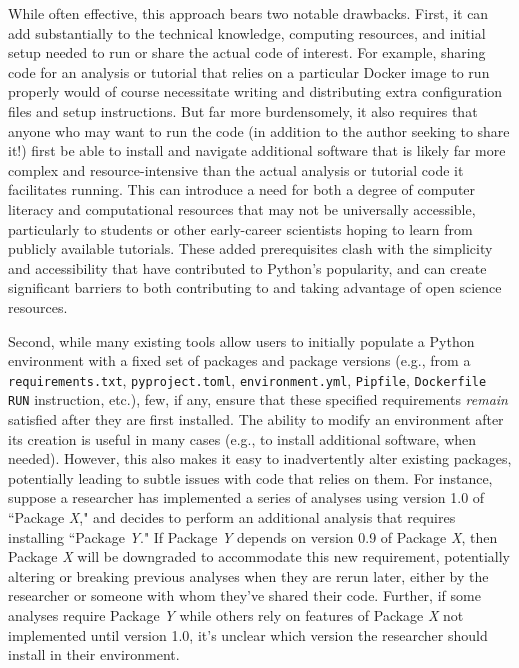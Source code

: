\documentclass[preprint,12pt, a4paper]{elsarticle}
\begin{document}
While often effective, this approach bears two notable drawbacks.
First, it can add substantially to the technical knowledge, computing
resources, and initial setup needed to run or share the actual code of
interest.  For example, sharing code for an analysis or tutorial that
relies on a particular Docker image to run properly would of course
necessitate writing and distributing extra configuration files and
setup instructions.  But far more burdensomely, it also requires that
anyone who may want to run the code (in addition to the author seeking
to share it!) first be able to install and navigate additional
software that is likely far more complex and resource-intensive than
the actual analysis or tutorial code it facilitates running.  This can
introduce a need for both a degree of computer literacy and
computational resources that may not be universally accessible,
particularly to students or other early-career scientists hoping to
learn from publicly available tutorials.  These added prerequisites
clash with the simplicity and accessibility that have contributed to
Python's popularity, and can create significant barriers to both
contributing to and taking advantage of open science resources.

Second, while many existing tools allow users to initially populate a
Python environment with a fixed set of packages and package versions
(e.g., from a \texttt{requirements.txt}, \texttt{pyproject.toml},
\texttt{environment.yml}, \texttt{Pipfile}, \texttt{Dockerfile RUN}
instruction, etc.), few, if any, ensure that these specified
requirements \textit{remain} satisfied after they are first installed.
The ability to modify an environment after its creation is useful in
many cases (e.g., to install additional software, when
needed). However, this also makes it easy to inadvertently alter
existing packages, potentially leading to subtle issues with code that
relies on them.  For instance, suppose a researcher has implemented a
series of analyses using version 1.0 of ``Package \textit{X}," and
decides to perform an additional analysis that requires installing
``Package \textit{Y}."  If Package \textit{Y} depends on version 0.9
of Package \textit{X}, then Package \textit{X} will be downgraded to
accommodate this new requirement, potentially altering or breaking
previous analyses when they are rerun later, either by the researcher
or someone with whom they've shared their code.  Further, if some
analyses require Package \textit{Y} while others rely on features of
Package \textit{X} not implemented until version 1.0, it's unclear
which version the researcher should install in their environment.
\end{document}
